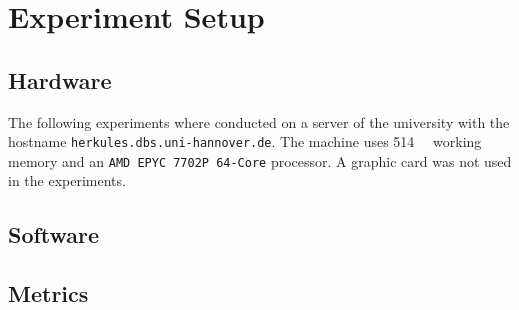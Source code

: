 \section{Experiment Setup}\label{sec:experiment-setup}
\subsection{Hardware}\label{subsec:experiment-setup_hardware}
The following experiments where conducted on a server of the university with the hostname \texttt{herkules.dbs.uni-hannover.de}. The machine uses \SI{514}{\gibi\byte} working memory and an \texttt{AMD EPYC 7702P 64-Core} processor. A graphic card was not used in the experiments.


\subsection{Software}\label{subsec:experiment-setup_software}


\subsection{Metrics}\label{subsec:experiment-setup_metrics}
